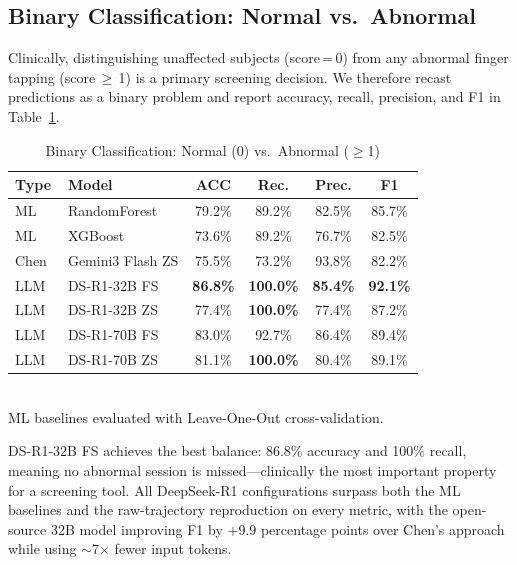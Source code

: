\documentclass[conference]{IEEEtran}
\begin{document}
\subsection{Binary Classification: Normal vs.\ Abnormal}

Clinically, distinguishing unaffected subjects (score\,=\,0) from any abnormal
finger tapping (score\,$\geq$\,1) is a primary screening decision. We therefore
recast predictions as a binary problem and report accuracy, recall, precision,
and F1 in Table~\ref{tab:binary}.

\begin{table}[htbp]
    \centering
    \caption{Binary Classification: Normal (0) vs.\ Abnormal ($\geq$1)}
    \label{tab:binary}
    \renewcommand{\arraystretch}{1.2}
    \begin{tabular}{llcccc}
        \toprule
        \textbf{Type} & \textbf{Model} & \textbf{ACC} & \textbf{Rec.} & \textbf{Prec.} & \textbf{F1} \\
        \midrule
        \rowcolor{gray!15} ML & RandomForest & 79.2\% & 89.2\% & 82.5\% & 85.7\% \\
        \rowcolor{gray!15} ML & XGBoost      & 73.6\% & 89.2\% & 76.7\% & 82.5\% \\
        \midrule
        Chen~\cite{chen2024chatgpt} & Gemini3 Flash ZS & 75.5\% & 73.2\% & 93.8\% & 82.2\% \\
        \midrule
        LLM & DS-R1-32B FS & \textbf{86.8\%} & \textbf{100.0\%} & \textbf{85.4\%} & \textbf{92.1\%} \\
        LLM & DS-R1-32B ZS & 77.4\% & \textbf{100.0\%} & 77.4\% & 87.2\% \\
        LLM & DS-R1-70B FS & 83.0\% & 92.7\% & 86.4\% & 89.4\% \\
        LLM & DS-R1-70B ZS & 81.1\% & \textbf{100.0\%} & 80.4\% & 89.1\% \\
        \bottomrule
    \end{tabular}
    \\[0.3em]
    {\small ML baselines evaluated with Leave-One-Out cross-validation.}
\end{table}

DS-R1-32B FS achieves the best balance: 86.8\% accuracy and 100\% recall,
meaning no abnormal session is missed---clinically the most important property
for a screening tool. All DeepSeek-R1 configurations surpass both the ML
baselines and the raw-trajectory reproduction on every metric, with the
open-source 32B model improving F1 by $+$9.9 percentage points over Chen's
approach while using $\sim$7$\times$ fewer input tokens.
\end{document}
